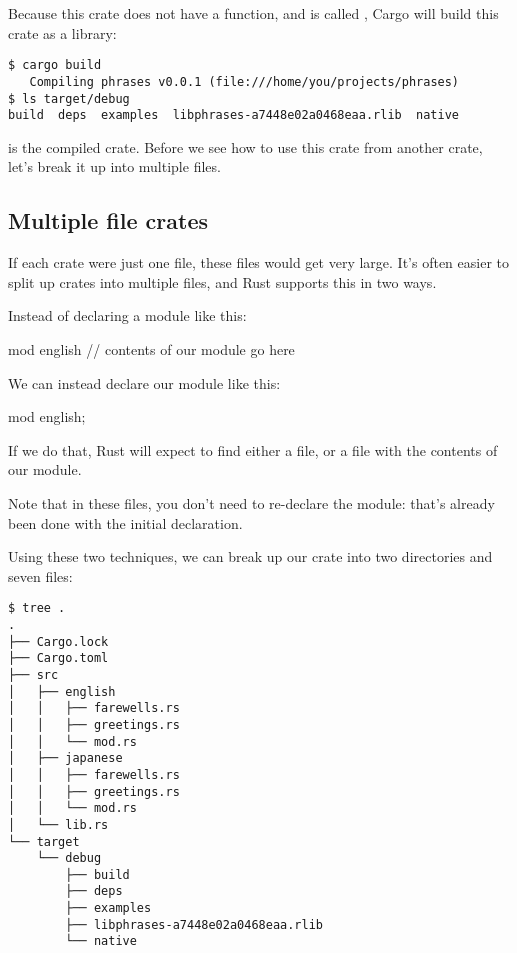 \blank

Because this crate does not have a  function, and is called , Cargo will build this crate as a library:

\begin{verbatim}
$ cargo build
   Compiling phrases v0.0.1 (file:///home/you/projects/phrases)
$ ls target/debug
build  deps  examples  libphrases-a7448e02a0468eaa.rlib  native
\end{verbatim}

 is the compiled crate. Before we see how to use this crate from another crate, let's break it up into 
multiple files.

\subsection*{Multiple file crates}

If each crate were just one file, these files would get very large. It's often easier to split up crates into multiple files, 
and Rust supports this in two ways.

\blank

Instead of declaring a module like this:

\begin{rustc}
mod english {
    // contents of our module go here
}
\end{rustc}

We can instead declare our module like this:

\begin{rustc}
mod english;
\end{rustc}

If we do that, Rust will expect to find either a  file, or a  file with the contents of our module.

\blank

Note that in these files, you don't need to re-declare the module: that's already been done with the initial  declaration.

\blank

Using these two techniques, we can break up our crate into two directories and seven files:

\begin{verbatim}
$ tree .
.
├── Cargo.lock
├── Cargo.toml
├── src
│   ├── english
│   │   ├── farewells.rs
│   │   ├── greetings.rs
│   │   └── mod.rs
│   ├── japanese
│   │   ├── farewells.rs
│   │   ├── greetings.rs
│   │   └── mod.rs
│   └── lib.rs
└── target
    └── debug
        ├── build
        ├── deps
        ├── examples
        ├── libphrases-a7448e02a0468eaa.rlib
        └── native
\end{verbatim}

